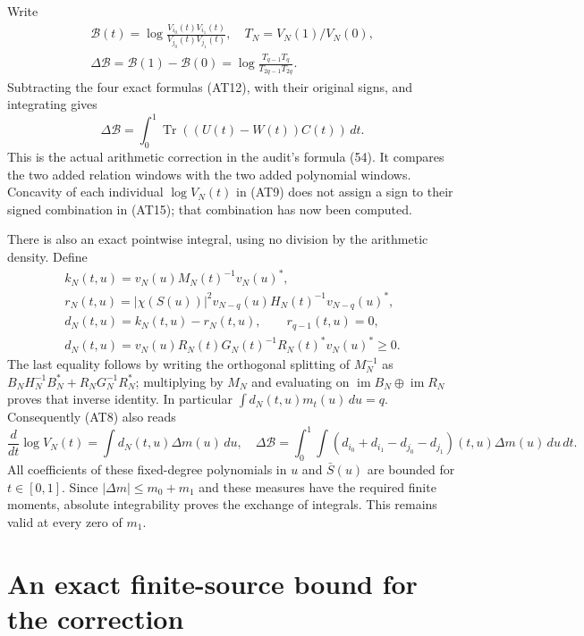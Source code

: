 \documentclass[11pt]{article}
\newcommand{\Tr}{\operatorname{Tr}}
\newcommand{\im}{\operatorname{im}}
\begin{document}
Write
\[
 \begin{gathered}
 \mathcal B(t)=\log\frac{V_{i_0}(t)V_{i_1}(t)}{V_{j_0}(t)V_{j_1}(t)},
 \quad T_N=V_N(1)/V_N(0),\\
 \Delta\mathcal B=\mathcal B(1)-\mathcal B(0)
 =\log\frac{T_{q-1}T_q}{T_{2q-1}T_{2q}}.       \tag{AT14}
 \end{gathered}
\]
Subtracting the four exact formulas (AT12), with their original
signs, and integrating gives
\[
 \boxed{\displaystyle
 \Delta\mathcal B=\int_0^1\Tr((U(t)-W(t))C(t))\,dt .}
                                                        \tag{AT15}
\]
This is the actual arithmetic correction in the audit's formula
(54). It compares the two added relation windows with the two
added polynomial windows. Concavity of each individual
$\log V_N(t)$ in (AT9) does not assign a sign to their signed
combination in (AT15); that combination has now been computed.

There is also an exact pointwise integral, using no division by
the arithmetic density. Define
\[
 \begin{gathered}
 k_N(t,u)=v_N(u)M_N(t)^{-1}v_N(u)^*,\\
 r_N(t,u)=|\chi(S(u))|^2
 v_{N-q}(u)H_N(t)^{-1}v_{N-q}(u)^*,\\
 d_N(t,u)=k_N(t,u)-r_N(t,u),\qquad r_{q-1}(t,u)=0,\\
 d_N(t,u)=v_N(u)R_N(t)G_N(t)^{-1}R_N(t)^*v_N(u)^*\ge0.
                                                        \tag{AT16}
 \end{gathered}
\]
The last equality follows by writing the orthogonal splitting
of $M_N^{-1}$ as
$B_NH_N^{-1}B_N^*+R_NG_N^{-1}R_N^*$; multiplying by $M_N$
and evaluating on $\im B_N\oplus\im R_N$ proves that inverse
identity. In particular $\int d_N(t,u)m_t(u)\,du=q$.
Consequently (AT8) also reads
\[
 \frac{d}{dt}\log V_N(t)=\int d_N(t,u)\Delta m(u)\,du,
\quad
 \Delta\mathcal B=\int_0^1\int
 (d_{i_0}+d_{i_1}-d_{j_0}-d_{j_1})(t,u)\Delta m(u)\,du\,dt.
                                                        \tag{AT17}
\]
All coefficients of these fixed-degree polynomials in $u$ and
$\bar S(u)$ are bounded for $t\in[0,1]$. Since
$|\Delta m|\le m_0+m_1$ and these measures have the required
finite moments, absolute integrability proves the exchange of
integrals. This remains valid at every zero of $m_1$.

\section{An exact finite-source bound for the correction}
\end{document}
